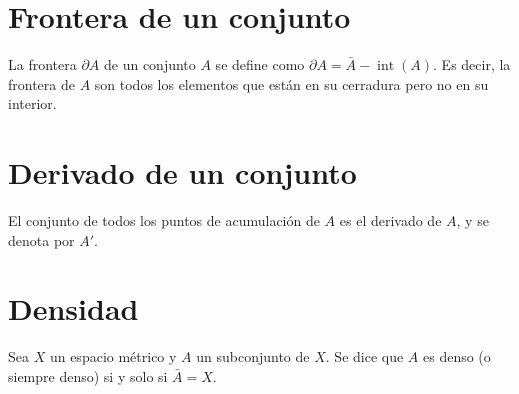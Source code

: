 \documentclass{article}
\DeclareMathOperator{\interior}{int}
\begin{document}
\section*{Frontera de un conjunto}

La frontera $\partial A$ de un conjunto $A$ se define como $\partial A=\bar{A}-\interior(A)$. Es decir, la frontera de $A$ son todos los elementos que están en su cerradura pero no en su interior.

\section*{Derivado de un conjunto}

El conjunto de todos los puntos de acumulación de $A$ es el derivado de $A$, y se denota por $A'$.

\section*{Densidad}

Sea $X$ un espacio métrico y $A$ un subconjunto de $X$. Se dice que $A$ es denso (o siempre denso) si y solo si $\bar{A}=X$.
\end{document}

